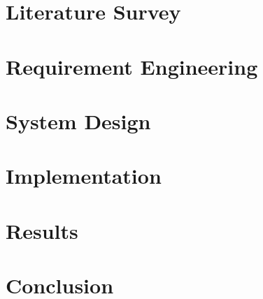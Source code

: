 \documentclass[a4paper, 11pt, oneside]{report}
\begin{document}
    \chapter{Literature Survey}
    
    \chapter{Requirement Engineering}
    
    \chapter{System Design}
    
    \chapter{Implementation}
    
    \chapter{Results}
    
    \chapter{Conclusion}
    
        
    \nocite{*}
    
	
        
\end{document}
